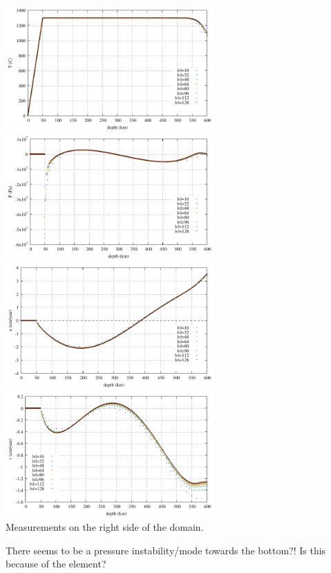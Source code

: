 \begin{center}
\includegraphics[width=8cm]{python_codes/fieldstone_149/results/case1c/rightT.pdf}
\includegraphics[width=8cm]{python_codes/fieldstone_149/results/case1c/rightP.pdf}\\
\includegraphics[width=8cm]{python_codes/fieldstone_149/results/case1c/rightu.pdf}
\includegraphics[width=8cm]{python_codes/fieldstone_149/results/case1c/rightv.pdf}\\
{\captionfont Measurements on the right side of the domain.}
\end{center}

There seems to be a pressure instability/mode towards the bottom?!
Is this because of the element?











